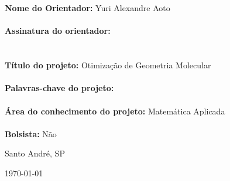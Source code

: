 \\
\\
\textbf{Nome do Orientador:} Yuri Alexandre Aoto
\\
\\
\textbf{Assinatura do orientador:}
\\
\\
\\
\textbf{Título do projeto:} Otimização de Geometria Molecular
\\
\\
\textbf{Palavras-chave do projeto:} 
\\
\\
\textbf{Área do conhecimento do projeto:} Matemática Aplicada
\\
\\
\textbf{Bolsista:} Não
\\

\vfill
	
\begin{center}
  {\large Santo André, SP \par}	
  {\large \today \par}
\end{center}
